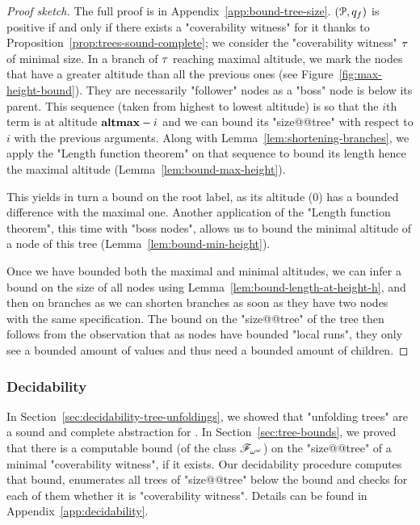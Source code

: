 \begin{proof}[Proof sketch]
	The full proof is in Appendix~\ref{app:bound-tree-size}. $(\mathcal{P},q_f)$ is positive if and only if there exists a "coverability witness" for it thanks to Proposition~\ref{prop:trees-sound-complete}; we consider the "coverability witness" $\tau$ of minimal size.
	In a branch of $\tau$ reaching maximal altitude, we mark the nodes that have a greater altitude than all the previous ones (see Figure~\ref{fig:max-height-bound}). They are necessarily "follower" nodes as a "boss" node is below its parent. This sequence (taken from highest to lowest altitude) is so that the $i$th term is at altitude $\mathbf{altmax}-i$ and we can bound its "size@@tree" with respect to $i$ with the previous arguments. Along with Lemma~\ref{lem:shortening-branches}, we apply the "Length function theorem" on that sequence to bound its length hence the maximal altitude (Lemma~\ref{lem:bound-max-height}).
	
	This yields in turn a bound on the root label, as its altitude ($0$) has a bounded difference with the maximal one. Another application of the "Length function theorem", this time with "boss nodes", allows us to bound the minimal altitude of a node of this tree (Lemma~\ref{lem:bound-min-height}).
	
	Once we have bounded both the maximal and minimal altitudes, we can infer a bound on the size of all nodes using Lemma~\ref{lem:bound-length-at-height-h}, and then on branches as we can shorten branches as soon as they have two nodes with the same specification.
	The bound on the "size@@tree" of the tree then follows from the observation that as nodes have bounded "local runs", they only see a bounded amount of values and thus need a bounded amount of children. 
\end{proof}


\subsubsection{Decidability}
\label{sec:decidability-end}

In Section~\ref{sec:decidability-tree-unfoldings}, we showed that "unfolding trees" are a sound and complete abstraction for \COVER. In Section~\ref{sec:tree-bounds}, we proved that there is a computable bound (of the class $\mathscr{F}_{\omega^\omega}$) on the "size@@tree" of a minimal "coverability witness", if it exists. Our decidability procedure computes that bound, enumerates all trees of "size@@tree" below the bound and checks for each of them whether it is "coverability witness". Details can be found in Appendix~\ref{app:decidability}.

\decidablecover*


